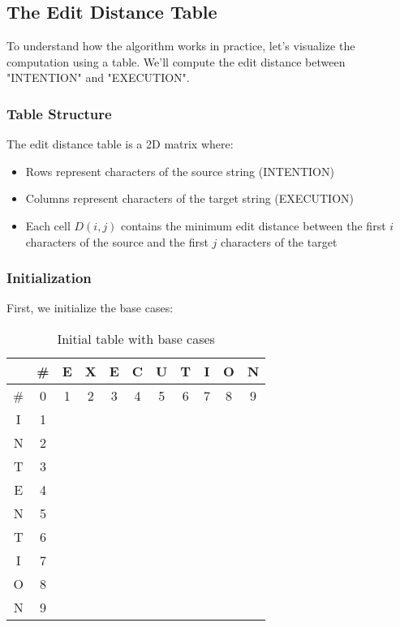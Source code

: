 \documentclass[11pt,a4paper]{article}
\theoremstyle{definition}
\theoremstyle{plain}
\theoremstyle{remark}
\begin{document}
\subsection{The Edit Distance Table}

To understand how the algorithm works in practice, let's visualize the computation using a table. We'll compute the edit distance between "INTENTION" and "EXECUTION".

\subsubsection{Table Structure}

The edit distance table is a 2D matrix where:
\begin{itemize}
    \item Rows represent characters of the source string (INTENTION)
    \item Columns represent characters of the target string (EXECUTION)
    \item Each cell $D(i,j)$ contains the minimum edit distance between the first $i$ characters of the source and the first $j$ characters of the target
\end{itemize}

\subsubsection{Initialization}

First, we initialize the base cases:

\begin{table}[h]
\centering
\begin{tabular}{|c|c|c|c|c|c|c|c|c|c|c|}
\hline
 & \# & E & X & E & C & U & T & I & O & N \\
\hline
\# & 0 & 1 & 2 & 3 & 4 & 5 & 6 & 7 & 8 & 9 \\
\hline
I & 1 &  &  &  &  &  &  &  &  &  \\
\hline
N & 2 &  &  &  &  &  &  &  &  &  \\
\hline
T & 3 &  &  &  &  &  &  &  &  &  \\
\hline
E & 4 &  &  &  &  &  &  &  &  &  \\
\hline
N & 5 &  &  &  &  &  &  &  &  &  \\
\hline
T & 6 &  &  &  &  &  &  &  &  &  \\
\hline
I & 7 &  &  &  &  &  &  &  &  &  \\
\hline
O & 8 &  &  &  &  &  &  &  &  &  \\
\hline
N & 9 &  &  &  &  &  &  &  &  &  \\
\hline
\end{tabular}
\caption{Initial table with base cases}
\end{table}
\end{document}
